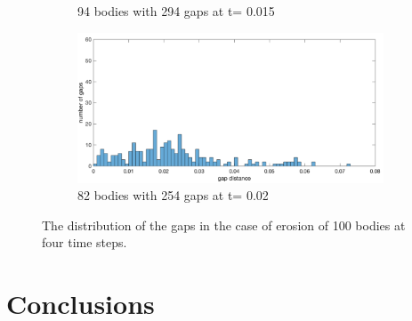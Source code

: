 \documentclass[preprint, 10pt]{elsarticle}
\begin{document}
\begin{figure}[H]
\begin{subfigure}[b]{0.5\textwidth}
\caption{94 bodies with 294 gaps at t= 0.015}
\end{subfigure}%
\begin{subfigure}[b]{0.5\textwidth}
\includegraphics*[width =\linewidth]{./figs/gap_hist100_200}
\caption{82 bodies with 254 gaps at t= 0.02}
\end{subfigure}
\caption{\label{fig:Eroding100gap} The distribution of the gaps in the
case of erosion of 100 bodies at four time steps.}
\end{figure}










\section{Conclusions}
\label{sec:conclusions}
\end{document}
